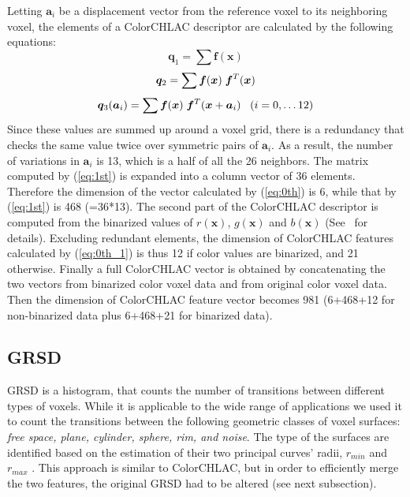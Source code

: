 \documentclass[conference]{sty/IEEEtran}
\begin{document}
%
Letting ${\bm a_i}$ be a displacement vector from the reference voxel to its neighboring voxel, 
the elements of a ColorCHLAC descriptor are calculated by the following equations:
\begin{equation}\label{eq:0th}
  {\bm q_1} = \sum \bm{f}({\bm x})
\end{equation}
\begin{equation}\label{eq:0th_1}
  {\bm q_2} = \sum \bm{f}({\bm x}) \hspace{1mm}\bm{f}^T({\bm x}) \\
\end{equation}
\begin{equation}\label{eq:1st}
  {\bm q_3}({\bm a}_i) = \sum \bm{f}({\bm x}) \hspace{1mm}\bm{f}^T({\bm x}+{\bm a_i}) \;\;\; (i=0, \dots 12) \\
\end{equation}
%
Since these values are summed up around a voxel grid, there is a redundancy that checks 
the same value twice over symmetric pairs of ${\bm a_i}$. 
As a result, the number of variations in ${\bm a_i}$ is 13, which is a half of all the 26 neighbors.
The matrix computed by (\ref{eq:1st}) is expanded into a column vector of 36 elements.
Therefore the dimension of the vector calculated by (\ref{eq:0th}) is 6, while that by 
(\ref{eq:1st}) is 468 (=36*13).
The second part of the ColorCHLAC descriptor is computed from the binarized values of $r(\bm{x})$, $g(\bm{x})$ 
and $b(\bm{x})$ (See~\cite{kanezaki2010icra} for details). 
Excluding redundant elements, the dimension of ColorCHLAC features calculated by (\ref{eq:0th_1}) 
is thus 12 if color values are binarized, and 21 otherwise. 
Finally a full ColorCHLAC vector is obtained by concatenating the two vectors from binarized 
color voxel data and from original color voxel data. Then the dimension of ColorCHLAC feature vector 
becomes 981 (6+468+12 for non-binarized data plus 6+468+21 for binarized data). 

\subsection{GRSD}
\label{sec:grsd}
GRSD is a histogram, that counts the number of transitions between different types of voxels.
While it is applicable to the wide range of applications we used it to count the transitions between 
the following geometric classes of voxel surfaces: \emph{free space, plane, cylinder, sphere, rim, and noise}.
The type of the surfaces are identified based on the estimation of their
two principal curves' radii, $r_{min}$ and $r_{max}$ \cite{Marton10IROS}.
This approach is similar to ColorCHLAC, but in order to efficiently merge the two features, 
the original GRSD had to be altered (see next subsection). 
\end{document}
